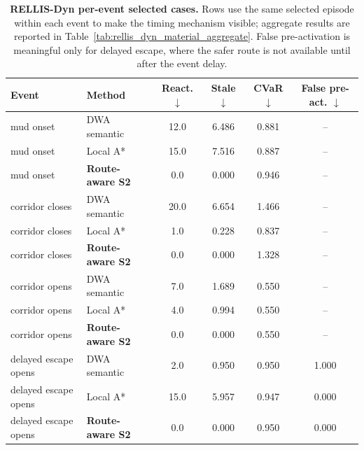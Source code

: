\begin{table}[t]
\centering
\small
\caption{\textbf{RELLIS-Dyn per-event selected cases.} Rows use the same selected episode within each event to make the timing mechanism visible; aggregate results are reported in Table~\ref{tab:rellis_dyn_material_aggregate}. False pre-activation is meaningful only for delayed escape, where the safer route is not available until after the event delay.}
\label{tab:rellis_dyn_per_event}
\begin{tabular}{llcccc}
\toprule
Event & Method & React. $\downarrow$ & Stale $\downarrow$ & CVaR $\downarrow$ & False pre-act. $\downarrow$ \\
\midrule
mud onset & DWA semantic & 12.0 & 6.486 & 0.881 & -- \\
mud onset & Local A* & 15.0 & 7.516 & 0.887 & -- \\
mud onset & \textbf{Route-aware S2} & 0.0 & 0.000 & 0.946 & -- \\
\midrule
corridor closes & DWA semantic & 20.0 & 6.654 & 1.466 & -- \\
corridor closes & Local A* & 1.0 & 0.228 & 0.837 & -- \\
corridor closes & \textbf{Route-aware S2} & 0.0 & 0.000 & 1.328 & -- \\
\midrule
corridor opens & DWA semantic & 7.0 & 1.689 & 0.550 & -- \\
corridor opens & Local A* & 4.0 & 0.994 & 0.550 & -- \\
corridor opens & \textbf{Route-aware S2} & 0.0 & 0.000 & 0.550 & -- \\
\midrule
delayed escape opens & DWA semantic & 2.0 & 0.950 & 0.950 & 1.000 \\
delayed escape opens & Local A* & 15.0 & 5.957 & 0.947 & 0.000 \\
delayed escape opens & \textbf{Route-aware S2} & 0.0 & 0.000 & 0.950 & 0.000 \\
\bottomrule
\end{tabular}
\end{table}
